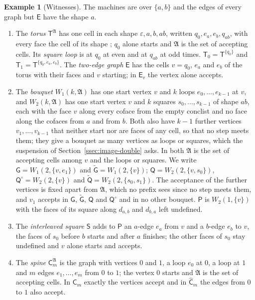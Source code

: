 \documentclass{lmcs}
\theoremstyle{definition}
\newtheorem{example}[theorem]{Example}
\theoremstyle{remark}
\newcommand{\ab}{\{a,b\}}
\providecommand{\wQ}{\mathsf{Q}}
\providecommand{\TB}[1]{\mathsf{T}^{#1}}
\providecommand{\Wq}[3]{W_{#1}(#2,#3)}
\providecommand{\Cs}[2]{\mathsf{C}_{#1}^{#2}}
\providecommand{\wG}{\mathsf{G}}
\providecommand{\wGt}{\tilde{\mathsf{G}}}
\providecommand{\wQ}{\mathsf{Q}}
\providecommand{\wQt}{\tilde{\mathsf{Q}}}
\providecommand{\wC}[1]{\mathsf{C}_{#1}}
\providecommand{\wCh}[1]{\hat{\mathsf{C}}_{#1}}
\begin{document}
\begin{example}[Witnesses]\label{exa:dec-witnesses}\label{exa:image-sq}\label{exa:image-pk}\label{exa:pair}\label{exa:image-loops}\label{exa:image-branch}
The machines are over $\ab$ and the edges of every graph but $\mathsf{E}$ have the shape $a$.
\begin{enumerate}
\item The \emph{torus} $\TB{\mathfrak A}$ has one cell in each shape $\varepsilon,a,b,ab$, written $q_0,e_a,e_b,q_{ab}$,
  with every face the cell of its shape \cite{PAF25};
  $q_0$ alone starts and $\mathfrak A$ is the set of accepting cells. Its \emph{square loop} is at $q_0$ at even and
  at $q_{ab}$ at odd times. $\mathsf{T}_0=\TB{\{q_0\}}$ and $\mathsf{T}_1=\TB{\{q_0,e_a,e_b\}}$. The
  \emph{two-edge graph} $\mathsf{E}$ has the cells $v=q_0$, $e_a$ and $e_b$ of the torus with their
  faces and $v$ starting; in $\mathsf{E}_v$ the vertex alone accepts.
\item The \emph{bouquet} $\Wq{1}{k}{\mathfrak A}$ has one start vertex $v$ and $k$ loops $e_0,\dots,e_{k-1}$ at $v$, and
  $\Wq{2}{k}{\mathfrak A}$ has one start vertex $v$ and $k$ squares $s_0,\dots,s_{k-1}$ of shape $ab$, each with the face
  $v$ along every coface from the empty conclist and no face along the cofaces from $a$ and from $b$. Both also
  have $k-1$ further vertices $v_1,\dots,v_{k-1}$ that neither start nor are faces of any
  cell, so that no step meets them; they give a bouquet as many vertices as
  loops or squares, which the suspension of Section~\ref{ssec:image-double} asks. In both $\mathfrak A$ is the set of accepting
  cells among $v$ and the loops or squares.
  We write $\wG=\Wq{1}{2}{\{v,e_1\}}$ and $\wGt=\Wq{1}{2}{\{v\}}$;
  $\wQ=\Wq{2}{2}{\{v,s_0\}}$, $\wQ^\circ=\Wq{2}{2}{\{v\}}$ and
  $\wQt=\Wq{2}{2}{\{s_0,s_1\}}$.
  The acceptance of the further vertices is fixed apart from $\mathfrak A$, which no prefix sees since no step meets them, and $v_1$ accepts in $\wG$, $\wGt$, $\wQ$ and
  $\wQ^\circ$ and in no other bouquet.
  $\mathsf{P}$ is $\Wq{2}{1}{\{v\}}$ with the faces of its square along $d_{a,b}$ and $d_{b,a}$ left
  undefined.
\item The \emph{interleaved square} $\mathsf{S}$ adds to $\mathsf{P}$ an $a$-edge $e_a$ from $v$ and a $b$-edge $e_b$ to
  $v$, the faces of $s_0$ before $b$ starts and after $a$ finishes; the other faces of $s_0$ stay undefined and
  $v$ alone starts and accepts.
\item The \emph{spine} $\Cs{m}{\mathfrak A}$ is the graph with vertices $0$ and $1$, a loop $e_0$ at $0$, a loop at $1$
  and $m$ edges $e_1,\dots,e_m$ from $0$ to $1$; the vertex $0$ starts and $\mathfrak A$ is the set of accepting cells. In
  $\wC{m}$ exactly the vertices accept and in $\wCh{m}$ the edges from $0$ to $1$ also
  accept.
\end{enumerate}
\end{example}
\end{document}
